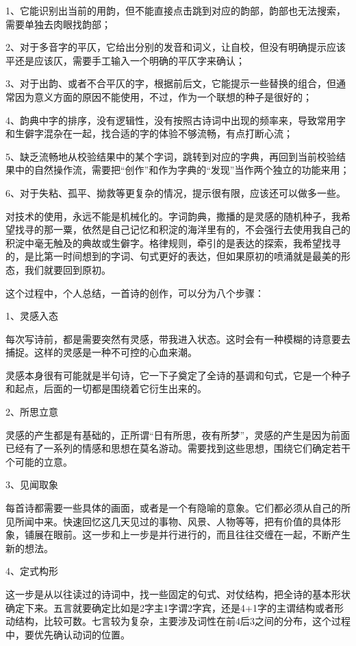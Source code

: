 \documentclass{article}
\begin{document}
1、它能识别出当前的用韵，但不能直接点击跳到对应的韵部，韵部也无法搜索，需要单独去肉眼找韵部；

2、对于多音字的平仄，它给出分别的发音和词义，让自校，但没有明确提示应该平还是应该仄，需要手工输入一个明确的平仄字来确认；

3、对于出韵、或者不合平仄的字，根据前后文，它能提示一些替换的组合，但通常因为意义方面的原因不能使用，不过，作为一个联想的种子是很好的；

4、韵典中字的排序，没有逻辑性，没有按照古诗词中出现的频率来，导致常用字和生僻字混杂在一起，找合适的字的体验不够流畅，有点打断心流；

5、缺乏流畅地从校验结果中的某个字词，跳转到对应的字典，再回到当前校验结果中的自然操作流，需要把``创作''和作为字典的``发现''当作两个独立的功能来用；

6、对于失粘、孤平、拗救等更复杂的情况，提示很有限，应该还可以做多一些。

对技术的使用，永远不能是机械化的。字词韵典，撒播的是灵感的随机种子，我希望找寻的那一粟，依然是自己记忆和积淀的海洋里有的，不会强行去使用我自己的积淀中毫无触及的典故或生僻字。格律规则，牵引的是表达的探索，我希望找寻的，是比第一时间想到的字词、句式更好的表达，但如果原初的喷涌就是最美的形态，我们就要回到原初。

这个过程中，个人总结，一首诗的创作，可以分为八个步骤：

1、灵感入态

每次写诗前，都是需要突然有灵感，带我进入状态。这时会有一种模糊的诗意要去捕捉。这样的灵感是一种不可控的心血来潮。

灵感本身很有可能就是半句诗，它一下子奠定了全诗的基调和句式，它是一个种子和起点，后面的一切都是围绕着它衍生出来的。

2、所思立意

灵感的产生都是有基础的，正所谓``日有所思，夜有所梦''，灵感的产生是因为前面已经有了一系列的情感和思想在莫名游动。需要找到这些思想，围绕它们确定若干个可能的立意。

3、见闻取象

每首诗都需要一些具体的画面，或者是一个有隐喻的意象。它们都必须从自己的所见所闻中来。快速回忆这几天见过的事物、风景、人物等等，把有价值的具体形象，铺展在眼前。这一步和上一步是并行进行的，而且往往交缠在一起，不断产生新的想法。

4、定式构形

这一步是从以往读过的诗词中，找一些固定的句式、对仗结构，把全诗的基本形状确定下来。五言就要确定比如是2字主1字谓2字宾，还是4+1字的主谓结构或者形动结构，比较可数。七言较为复杂，主要涉及词性在前4后3之间的分布，这个过程中，要优先确认动词的位置。
\end{document}
